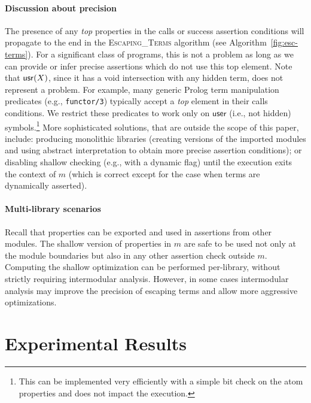 \documentclass{llncs}
\begin{document}
\paragraph{Discussion about precision}
%
The presence of any \emph{top} %
properties in the calls or success assertion conditions will propagate
to the end in the \textsc{Escaping\_Terms} algorithm (see
Algorithm~\ref{fig:esc-terms}).
%
For a significant class of programs, this is not a problem as long as we
can provide or infer precise assertions which do not use this top element.
%
Note that $\mathsf{usr}(X)$, since it has a void intersection with
any hidden term, does not represent a problem.
%
For example, many generic Prolog term manipulation predicates (e.g.,
\texttt{functor/3}) typically accept a \emph{top} element in their
calls conditions. We restrict these predicates to work only on
$\mathsf{user}$ (i.e., not hidden) symbols.\footnote{This can be
  implemented very efficiently with a simple bit check on the atom
  properties and does not impact the execution.}
%
More sophisticated solutions, that are outside the scope of this
paper, include: producing monolithic libraries (creating versions of
the imported modules and using abstract interpretation to obtain more
precise assertion conditions); or disabling shallow checking (e.g.,
with a dynamic flag) until the execution exits the context of $m$
(which is correct except for the case when terms are dynamically asserted).


\paragraph{Multi-library scenarios}
Recall that properties can be exported and used in assertions
from other modules.
%
The shallow version of properties in $m$ are safe to be used not only
at the module boundaries but also in any other assertion check outside
$m$.
%
Computing the shallow optimization can be performed per-library,
without strictly requiring intermodular analysis. However, in some cases
intermodular analysis may improve the precision of escaping terms and
allow more aggressive optimizations.



\section{Experimental Results}
\end{document}
